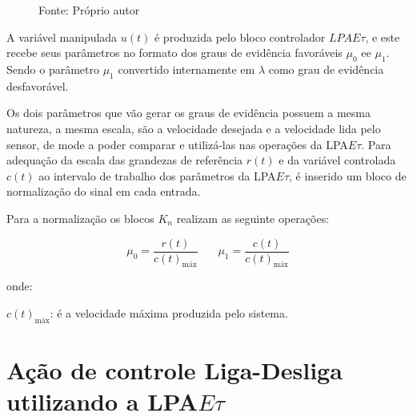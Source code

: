 \begin{figure}[!h]
\label{fig:diagramaBlocosLPAEt}

{\vspace{0.2cm} \small Fonte: Próprio autor}
\end{figure}


A variável manipulada $u(t)$ é produzida pelo 
bloco controlador $LPAE\tau$, 
e este recebe seus parâmetros no formato dos 
graus de evidência favoráveis $\mu_0$ ee $\mu_1$.
Sendo o parâmetro $\mu_1$ 
convertido internamente em $\lambda$ 
como grau de evidência desfavorável.

Os dois parâmetros que vão gerar os graus de evidência 
possuem a mesma natureza, a mesma escala, 
são a velocidade desejada e a velocidade lida pelo sensor,
de mode a poder comparar e utilizá-las nas operações da
LPA$E\tau$. 
Para adequação da escala das grandezas 
de referência $r(t)$ e da variável controlada $c(t)$
ao intervalo de trabalho dos parâmetros da LPA$E\tau$, 
é inserido um bloco de normalização do sinal em cada entrada.


Para a normalização os blocos $K_n$ realizam as seguinte operações:

\begin{equation}
\mu_0 = \frac{ r(t)}{c(t)_{\text{máx}}} \ \ \ \ \ \ \ \ \mu_1 = \frac{c(t)}{c(t)_{\text{máx}}}
\end{equation}

onde:

$c(t)_{\text{máx}}$: é a velocidade máxima produzida pelo sistema.





\newpage

\section{Ação de controle Liga-Desliga utilizando a LPA$E\tau$}

